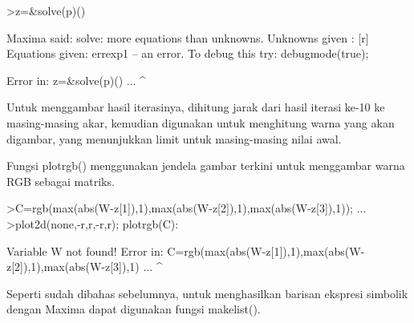 \documentclass{article}
\begin{document}
\begin{eulernotebook}
\begin{eulercomment}
\begin{eulercomment}
\begin{eulercomment}
\begin{eulercomment}
\begin{eulercomment}
\begin{eulercomment}
\begin{eulercomment}
\begin{eulercomment}
\begin{eulercomment}
\begin{eulercomment}
\begin{eulercomment}
\begin{eulercomment}
\begin{eulercomment}
\begin{eulercomment}
\begin{eulercomment}
\begin{eulercomment}
\begin{eulercomment}
\begin{eulercomment}
\begin{eulercomment}
\begin{eulercomment}
\begin{eulercomment}
\begin{eulercomment}
\begin{eulercomment}
\begin{eulercomment}
\begin{eulercomment}
\begin{eulercomment}
\begin{eulercomment}
\begin{eulercomment}
\begin{eulercomment}
\begin{eulercomment}
\begin{eulercomment}
\begin{eulercomment}
\begin{eulercomment}
\begin{eulercomment}
\begin{eulercomment}
\begin{eulercomment}
\begin{eulerprompt}
>z=&solve(p)()
\end{eulerprompt}
\begin{euleroutput}
  Maxima said:
  solve: more equations than unknowns.
  Unknowns given :  
  [r]
  Equations given:  
  errexp1
   -- an error. To debug this try: debugmode(true);
  
  Error in:
  z=&solve(p)() ...
             ^
\end{euleroutput}
\begin{eulercomment}
Untuk menggambar hasil iterasinya, dihitung jarak dari hasil iterasi
ke-10 ke masing-masing akar, kemudian digunakan untuk menghitung warna
yang akan digambar, yang menunjukkan limit untuk masing-masing nilai
awal. 

Fungsi plotrgb() menggunakan jendela gambar terkini untuk menggambar
warna RGB sebagai matriks.
\end{eulercomment}
\begin{eulerprompt}
>C=rgb(max(abs(W-z[1]),1),max(abs(W-z[2]),1),max(abs(W-z[3]),1)); ...
>plot2d(none,-r,r,-r,r); plotrgb(C):
\end{eulerprompt}
\begin{euleroutput}
  Variable W not found!
  Error in:
  C=rgb(max(abs(W-z[1]),1),max(abs(W-z[2]),1),max(abs(W-z[3]),1) ...
                      ^
\end{euleroutput}
\begin{eulercomment}
\begin{eulercomment}
\begin{eulercomment}
Seperti sudah dibahas sebelumnya, untuk menghasilkan barisan ekspresi
simbolik dengan Maxima dapat digunakan fungsi makelist().
\end{eulercomment}

\end{eulercomment}
\end{eulercomment}
\end{eulercomment}
\end{eulercomment}
\end{eulercomment}
\end{eulercomment}
\end{eulercomment}
\end{eulercomment}
\end{eulercomment}
\end{eulercomment}
\end{eulercomment}
\end{eulercomment}
\end{eulercomment}
\end{eulercomment}
\end{eulercomment}
\end{eulercomment}
\end{eulercomment}
\end{eulercomment}
\end{eulercomment}
\end{eulercomment}
\end{eulercomment}
\end{eulercomment}
\end{eulercomment}
\end{eulercomment}
\end{eulercomment}
\end{eulercomment}
\end{eulercomment}
\end{eulercomment}
\end{eulercomment}
\end{eulercomment}
\end{eulercomment}
\end{eulercomment}
\end{eulercomment}
\end{eulercomment}
\end{eulercomment}
\end{eulercomment}
\end{eulercomment}
\end{eulercomment}
\end{eulernotebook}
\end{document}
